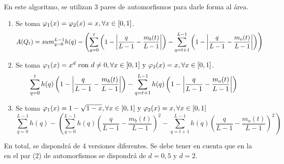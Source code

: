 \documentclass[main]{subfiles}
\begin{document}
En este algoritmo, se utilizan 3 pares de automorfismos para darle forma al área.




\begin{enumerate}\label{enum:funcionesalg2}
    \item Se toma $\varphi_1(x) = \varphi_2(x) = x, \forall x\in[0,1]$.
    $$A(Q_t) = sum_{q=0}^{L-1} h(q) - \left(\sum_{q=0}^{t} \left(1-\left\vert\frac{q}{L-1}-\frac{m_b(t)}{L-1}\right\vert\right) - \sum_{q=t+1}^{L-1} \left(1-\left\vert\frac{q}{L-1}-\frac{m_o(t)}{L-1}\right\vert\right)\right)$$
    \item Se toma $\varphi_1(x) = x^d \text{ con } d\neq0, \forall x\in[0,1] \text{ y } \varphi_2(x)=x, \forall x\in[0,1]$.
    $$\sum_{q=0}^{t} h(q) \left(1-\left\vert\frac{q}{L-1}-\frac{m_b(t)}{L-1}\right\vert\right) - \sum_{q=t+1}^{L-1} h(q) \left(1-\left\vert\frac{q}{L-1}-\frac{m_o(t)}{L-1}\right\vert\right)$$
    \item Se toma $\varphi_1(x) = 1-\sqrt{1-x}, \forall x\in[0,1] \text{ y } \varphi_2(x)=x,\forall x\in[0,1]$
    $$\sum_{q=0}^{L-1} h(q) - \left(\sum_{q=0}^{L-1} h(q) \left(\frac{q}{L-1}-\frac{m_b(t)}{L-1}\right)^2 - \sum_{q=t+1}^{L-1} h(q) \left(\frac{q}{L-1}-\frac{m_o(t)}{L-1}\right)^2\right)$$
\end{enumerate}
En total, se dispondrá de 4 versiones diferentes. Se debe tener en cuenta que en la en el par (2) de automorfismos se dispondrá de $d=0,5$ y $d=2$.
\end{document}
